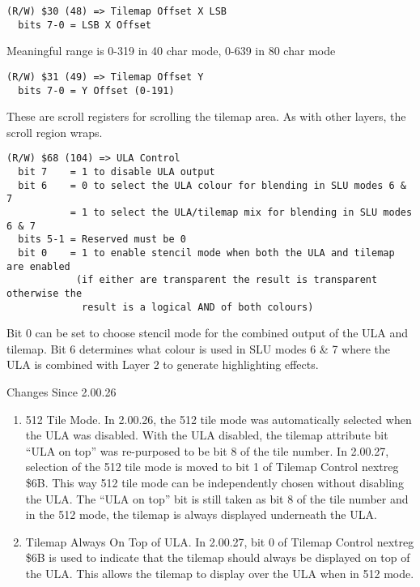 \begin{verbatim}
(R/W) $30 (48) => Tilemap Offset X LSB
  bits 7-0 = LSB X Offset
\end{verbatim}

Meaningful range is 0-319 in 40 char mode, 0-639 in 80 char mode

\begin{verbatim}
(R/W) $31 (49) => Tilemap Offset Y
  bits 7-0 = Y Offset (0-191)
\end{verbatim}

These are scroll registers for scrolling the tilemap area. As with
other layers, the scroll region wraps.

\begin{verbatim}
(R/W) $68 (104) => ULA Control
  bit 7    = 1 to disable ULA output
  bit 6    = 0 to select the ULA colour for blending in SLU modes 6 & 7
           = 1 to select the ULA/tilemap mix for blending in SLU modes 6 & 7
  bits 5-1 = Reserved must be 0
  bit 0    = 1 to enable stencil mode when both the ULA and tilemap are enabled
            (if either are transparent the result is transparent otherwise the
             result is a logical AND of both colours)
\end{verbatim}

Bit 0 can be set to choose stencil mode for the combined output of the
ULA and tilemap. Bit 6 determines what colour is used in SLU modes 6 \&
7 where the ULA is combined with Layer 2 to generate highlighting
effects.

Changes Since 2.00.26

\begin{enumerate}
\item 512 Tile Mode. In 2.00.26, the 512 tile mode was automatically
  selected when the ULA was disabled. With the ULA disabled, the
  tilemap attribute bit “ULA on top” was re-purposed to be bit 8 of
  the tile number. In 2.00.27, selection of the 512 tile mode is moved
  to bit 1 of Tilemap Control nextreg \$6B. This way 512 tile mode can
  be independently chosen without disabling the ULA. The “ULA on top”
  bit is still taken as bit 8 of the tile number and in the 512 mode,
  the tilemap is always displayed underneath the ULA.
\item Tilemap Always On Top of ULA. In 2.00.27, bit 0 of Tilemap
  Control nextreg \$6B is used to indicate that the tilemap should
  always be displayed on top of the ULA. This allows the tilemap to
  display over the ULA when in 512 mode.
\end{enumerate}

